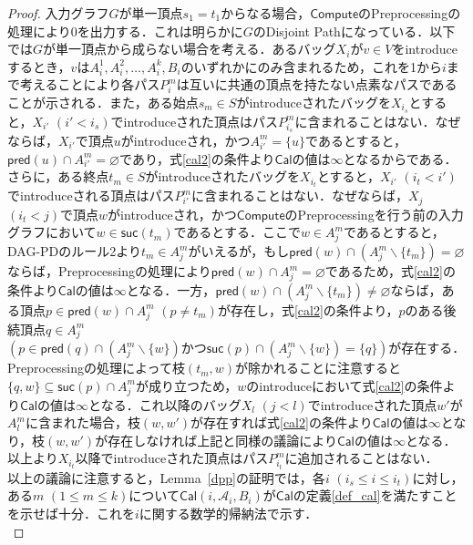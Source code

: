 \documentclass[master]{kuisthesis}		%
\theoremstyle{plain}
\theoremstyle{definition}
\begin{document}
\begin{proof}
    入力グラフ$G$が単一頂点$s_1=t_1$からなる場合，$\mathsf{Compute}$のPreprocessingの処理により0を出力する．これは明らかに$G$のDisjoint Pathになっている．以下では$G$が単一頂点から成らない場合を考える．あるバッグ$X_i$が$v \in V$をintroduceするとき，$v$は$A^1_i, A^2_i,  \dots, A^k_i, B_i$のいずれかにのみ含まれるため，これを1から$i$まで考えることにより各パス$P^m_i$は互いに共通の頂点を持たない点素なパスであることが示される．また，ある始点$s_m \in S$がintroduceされたバッグを$X_{i_s}$とすると，$X_{i'}$ $(i' < i_s)$でintroduceされた頂点はパス$P^m_{i_s}$に含まれることはない．なぜならば，$X_{i'}$で頂点$u$がintroduceされ，かつ$A^m_{i'} = \{u\}$であるとすると，$\mathsf{pred}(u) \cap A^m_{i'} = \varnothing$であり，式\ref{cal2}の条件より$\mathsf{Cal}$の値は$\infty$となるからである．さらに，ある終点$t_m \in S$がintroduceされたバッグを$X_{i_t}$とすると，$X_{i'}$ $(i_t < i')$でintroduceされる頂点はパス$P^m_{i'}$に含まれることはない．なぜならば，$X_j$ $(i_t < j)$で頂点$w$がintroduceされ，かつ$\mathsf{Compute}$のPreprocessingを行う前の入力グラフにおいて$w \in \mathsf{suc}(t_m)$であるとする．ここで$w \in A^m_j$であるとすると，DAG-PDのルール2より$t_m \in A^m_j$がいえるが，もし$\mathsf{pred}(w) \cap (A^m_j \backslash \{t_m\}) = \varnothing$ならば，Preprocessingの処理により$\mathsf{pred}(w) \cap A^m_j = \varnothing$であるため，式\ref{cal2}の条件より$\mathsf{Cal}$の値は$\infty$となる．一方，$\mathsf{pred}(w) \cap (A^m_j \backslash \{t_m\}) \neq \varnothing$ならば，ある頂点$p \in \mathsf{pred}(w) \cap A^m_j$ $(p \neq t_m)$が存在し，式\ref{cal2}の条件より，$p$のある後続頂点$q \in A^m_j$ $(p \in \mathsf{pred}(q) \cap (A^m_j \backslash \{w\}) \text{かつ} \mathsf{suc}(p) \cap (A^m_j \backslash \{w\}) = \{q\})$が存在する．Preprocessingの処理によって枝$(t_m, w)$が除かれることに注意すると$\{q, w\} \subseteq \mathsf{suc}(p) \cap A^m_j$が成り立つため，$w$のintroduceにおいて式\ref{cal2}の条件より$\mathsf{Cal}$の値は$\infty$となる．これ以降のバッグ$X_l$ $(j < l)$でintroduceされた頂点$w'$が$A^m_l$に含まれた場合，枝$(w, w')$が存在すれば式\ref{cal2}の条件より$\mathsf{Cal}$の値は$\infty$となり，枝$(w, w')$が存在しなければ上記と同様の議論により$\mathsf{Cal}$の値は$\infty$となる．以上より$X_{i_t}$以降でintroduceされた頂点はパス$P^m_{i_t}$に追加されることはない．\\
    以上の議論に注意すると，Lemma~\ref{dpp}の証明では，各$i$ $(i_s \leq i \leq i_t)$に対し，ある$m$ $(1 \leq m \leq k)$について$\mathsf{Cal}(i, \mathscr{A}_i, B_i)$が$\mathsf{Cal}$の定義\ref{def_cal}を満たすことを示せば十分．これを$i$に関する数学的帰納法で示す．\\

\end{proof}
\end{document}
